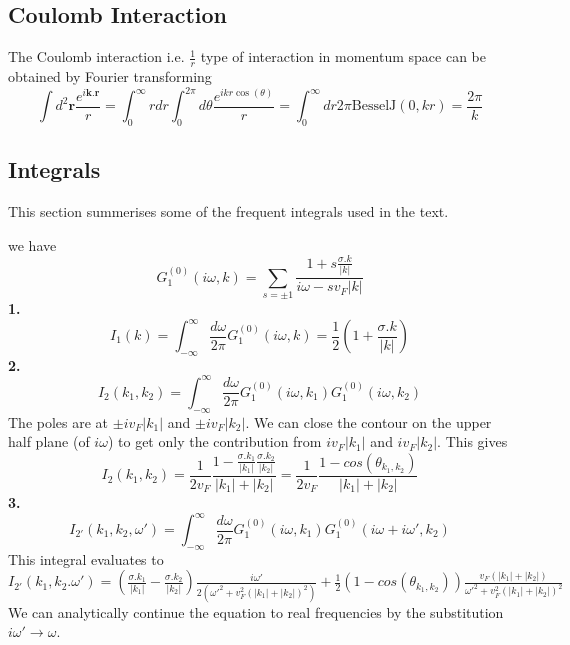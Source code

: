 \documentclass[a4paper,crop=false]{standalone}
\begin{document}
	\subsection*{Coulomb Interaction}
		The Coulomb interaction i.e. $\frac{1}{r}$ type of interaction in momentum space can be obtained by Fourier transforming
		\begin{equation}
			\int d^2\mathbf{r}\frac{e^{i\mathbf{k}.\mathbf{r}}}{r} = \int_{0}^{\infty}rdr\int_{0}^{2\pi}d\theta \frac{e^{ikr \cos(\theta)}}{r} = \int_{0}^{\infty}dr 2\pi \text{BesselJ}(0,kr) = \frac{2\pi}{k}
		\end{equation}
	\subsection*{Integrals}
	This section summerises some of the frequent integrals used in the text.

	we have 
	\begin{equation}
		G_{1}^{(0)}(i\omega,k) = \sum_{s=\pm 1}\frac{1 + s\frac{\sigma . k}{|k|}}{i \omega - s v_F |k|}
	\end{equation}
	\textbf{1.}
	\[
	I_1(k) = \int_{-\infty}^{\infty} \frac{d\omega}{2\pi} G_{1}^{(0)}(i\omega,k) = \frac{1}{2}\left(1 + \frac{\sigma . k}{|k|}\right)
	\]
	\textbf{2.}
	\[
	I_{2}(k_1,k_2) = \int_{-\infty}^{\infty}\frac{d\omega}{2\pi}G_{1}^{(0)}(i\omega,k_1)G_{1}^{(0)}(i\omega,k_2)
	\]
	The poles are at $\pm i v_F |k_1|$ and $\pm i v_F |k_2|$. We can close the contour on the upper half plane (of $i\omega$) to get only the contribution from $i v_F |k_1|$ and $i v_F |k_2|$. This gives 
	\begin{equation}
		I_{2}(k_1,k_2) = \frac{1}{2v_F}\frac{1 - \frac{\sigma . k_1}{|k_1|}\frac{\sigma . k_2}{|k_2|}}{|k_1| + |k_2|} = \frac{1}{2v_F}\frac{1 - cos(\theta_{k_1,k_2})}{|k_1| + |k_2|}	
	\end{equation}
	\textbf{3.}
	\begin{equation}
		I_{2'}(k_1,k_2,\omega') = \int_{-\infty}^{\infty}\frac{d\omega}{2\pi}G_{1}^{(0)}(i\omega,k_1)G_{1}^{(0)}(i\omega+i\omega',k_2)
	\end{equation}
	This integral evaluates to
	\begin{equation}\label{eqn:I2prime}
		I_{2'}(k_1,k_2.\omega') = \left(\tfrac{\sigma .k_1}{|k_1|}  - \tfrac{\sigma . k_2}{|k_2|}\right)\tfrac{i\omega'}{2(\omega'^2 + v_F^2(|k_1| + |k_2|)^2)} + \tfrac{1}{2}\left(1 - cos(\theta_{k_1,k_2})\right)\tfrac{v_F(|k_1| + |k_2|)}{\omega'^2 + v_F^2(|k_1| + |k_2|)^2}
	\end{equation}
	We can analytically continue the equation to real frequencies by the substitution $i\omega'\to\omega$.
\end{document}
